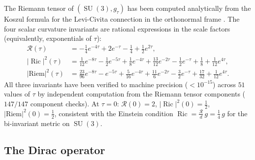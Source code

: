 \documentclass[12pt]{article}
\theoremstyle{definition}
\theoremstyle{remark}
\DeclareMathOperator{\Ric}{Ric}
\DeclareMathOperator{\SU}{SU}
\begin{document}
The Riemann tensor of $(\SU(3), g_\tau)$ has been computed analytically
from the Koszul formula for the Levi-Civita connection in the
orthonormal frame \cite{Baptista2024}.  The four scalar
curvature invariants are rational expressions in the scale factors
(equivalently, exponentials of $\tau$):
\begin{align}
  \mathcal{R}(\tau) &= -\tfrac{1}{4}e^{-4\tau} + 2e^{-\tau}
    - \tfrac{1}{4} + \tfrac{1}{2}e^{2\tau},
    \label{eq:scalar-curv}\\[4pt]
  |\Ric|^2(\tau) &= \tfrac{1}{12}e^{-8\tau}
    - \tfrac{1}{2}e^{-5\tau}
    + \tfrac{1}{8}e^{-4\tau}
    + \tfrac{13}{12}e^{-2\tau}
    - \tfrac{1}{2}e^{-\tau}
    + \tfrac{1}{8}
    + \tfrac{1}{12}e^{4\tau},
    \label{eq:ricci-sq}\\[4pt]
  |\mathrm{Riem}|^2(\tau) &= \tfrac{23}{96}e^{-8\tau}
    - e^{-5\tau}
    + \tfrac{5}{16}e^{-4\tau}
    + \tfrac{11}{6}e^{-2\tau}
    - \tfrac{3}{2}e^{-\tau}
    + \tfrac{17}{32}
    + \tfrac{1}{12}e^{4\tau}.
    \label{eq:kretschner}
\end{align}
All three invariants have been verified to machine precision
($< 10^{-15}$) across $51$ values of $\tau$ by independent computation
from the Riemann tensor components ($147/147$ component checks).
At $\tau = 0$: $\mathcal{R}(0) = 2$, $|\Ric|^2(0) = \tfrac{1}{2}$,
$|\mathrm{Riem}|^2(0) = \tfrac{1}{2}$, consistent with the Einstein
condition $\Ric = \tfrac{\mathcal{R}}{d}\, g = \tfrac{1}{4}\, g$ for
the bi-invariant metric on $\SU(3)$.


\subsection{The Dirac operator}
\end{document}
